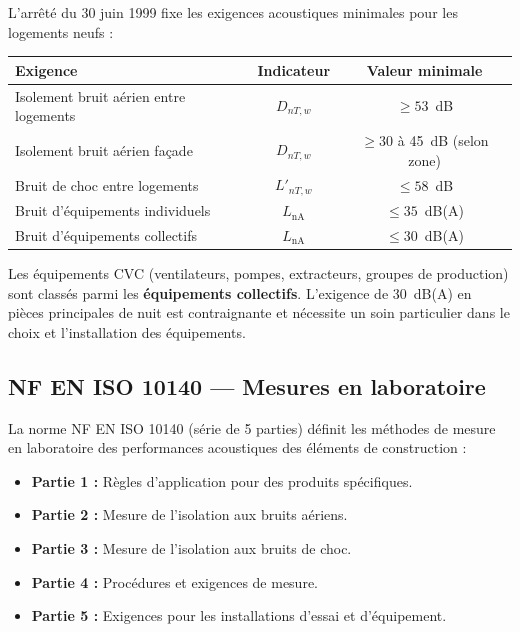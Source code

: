 L'arrêté du 30 juin 1999 fixe les exigences acoustiques minimales pour les logements neufs :

\begin{center}
\begin{tabular}{lcc}
\toprule
Exigence & Indicateur & Valeur minimale \\
\midrule
Isolement bruit aérien entre logements & $D_{nT,w}$ & $\geq 53$~dB \\
Isolement bruit aérien façade & $D_{nT,w}$ & $\geq 30$ à 45~dB (selon zone) \\
Bruit de choc entre logements & $L'_{nT,w}$ & $\leq 58$~dB \\
Bruit d'équipements individuels & $L_{\text{nA}}$ & $\leq 35$~dB(A) \\
Bruit d'équipements collectifs & $L_{\text{nA}}$ & $\leq 30$~dB(A) \\
\bottomrule
\end{tabular}
\end{center}

\begin{attention}
Les équipements CVC (ventilateurs, pompes, extracteurs, groupes de production) sont classés parmi les \textbf{équipements collectifs}. L'exigence de 30~dB(A) en pièces principales de nuit est contraignante et nécessite un soin particulier dans le choix et l'installation des équipements.
\end{attention}

\subsection{NF EN ISO 10140 — Mesures en laboratoire}

La norme NF EN ISO 10140 (série de 5 parties) définit les méthodes de mesure en laboratoire des performances acoustiques des éléments de construction :
\begin{itemize}
  \item \textbf{Partie 1 :} Règles d'application pour des produits spécifiques.
  \item \textbf{Partie 2 :} Mesure de l'isolation aux bruits aériens.
  \item \textbf{Partie 3 :} Mesure de l'isolation aux bruits de choc.
  \item \textbf{Partie 4 :} Procédures et exigences de mesure.
  \item \textbf{Partie 5 :} Exigences pour les installations d'essai et d'équipement.
\end{itemize}

